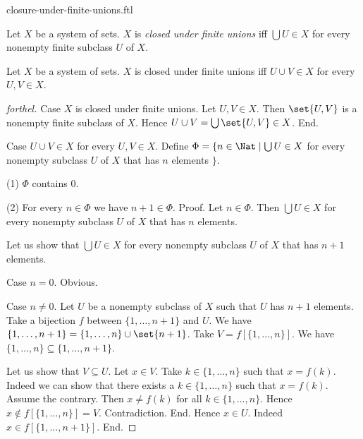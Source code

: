 \documentclass{naproche-library}
\begin{document}
\begin{smodule}[title=Closure Under Finite Unions]{closure-under-finite-unions.ftl}

\begin{definition}[forthel,id=FOUNDATIONS_14_7040118193913856]
  Let $X$ be a system of sets.
  $X$ is \emph{closed under finite unions} iff $\bigcup U \in X$ for every nonempty finite subclass $U$ of $X$.
\end{definition}

\begin{proposition}[forthel,id=FOUNDATIONS_17_4164024962908160]
  Let $X$ be a system of sets.
  $X$ is closed under finite unions iff $U \cup V \in X$ for every $U, V \in X$.
\end{proposition}
\begin{proof}[forthel]
  Case $X$ is closed under finite unions.
    Let $U, V \in X$.
    Then $\set{U, V}$ is a nonempty finite subclass of $X$.
    Hence $U \cup V = \bigcup \set{U, V} \in X$.
  End.

  Case $U \cup V \in X$ for every $U, V \in X$.
    Define $\Phi = \{ n \in \Nat \mid \bigcup U \in X$ for every nonempty subclass $U$ of $X$ that has $n$ elements $\}$.

    (1) $\Phi$ contains $0$.

    (2) For every $n \in \Phi$ we have $n + 1 \in \Phi$. \newline
    Proof.
      Let $n \in \Phi$.
      Then $\bigcup U \in X$ for every nonempty subclass $U$ of $X$ that has $n$ elements.

      Let us show that $\bigcup U \in X$ for every nonempty subclass $U$ of $X$ that has $n + 1$ elements.

        Case $n = 0$. Obvious.

        Case $n \neq 0$.
          Let $U$ be a nonempty subclass of $X$ such that $U$ has $n + 1$ elements.
          Take a bijection $f$ between $\{1, \dots, n + 1 \}$ and $U$.
          We have $\{ 1, \dots, n + 1 \} = \{ 1, \dots, n \} \cup \set{n + 1}$.
          Take $V = f[\{ 1, \dots, n \}]$.
          We have $\{ 1, \dots, n \} \subseteq \{ 1, \dots, n + 1 \}$.

          Let us show that $V \subseteq U$.
            Let $x \in V$.
            Take $k \in \{ 1, \dots, n \}$ such that $x = f(k)$.
            Indeed we can show that there exists a $k \in \{ 1, \dots, n \}$ such that $x = f(k)$.
              Assume the contrary.
              Then $x \neq f(k)$ for all $k \in \{ 1, \dots, n \}$.
              Hence $x \notin f[\{ 1, \dots, n \}] = V$.
              Contradiction.
            End.
            Hence $x \in U$.
            Indeed $x \in f[\{ 1, \dots, n + 1 \}]$.
          End.


\end{proof}
\end{smodule}
\end{document}
